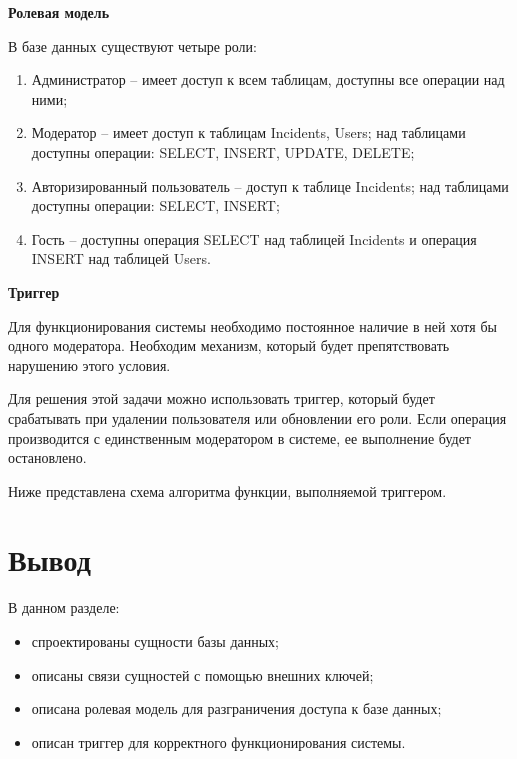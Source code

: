 \noindent\textbf{Ролевая модель}

В базе данных существуют четыре роли:
\begin{enumerate}
\item Администратор -- имеет доступ к всем таблицам, доступны все операции над ними;
\item Модератор -- имеет доступ к таблицам Incidents, Users; над таблицами доступны операции: SELECT, INSERT, UPDATE, DELETE;
\item Авторизированный пользователь -- доступ к таблице Incidents; над таблицами доступны операции: SELECT, INSERT; 
\item Гость -- доступны операция SELECT над таблицей Incidents и операция INSERT над таблицей Users.
\end{enumerate}

\noindent\textbf{Триггер}

Для функционирования системы необходимо постоянное наличие в ней хотя бы одного модератора. Необходим механизм, который будет препятствовать нарушению этого условия.

Для решения этой задачи можно использовать триггер, который будет срабатывать при удалении пользователя или обновлении его роли. Если операция производится с единственным модератором в системе, ее выполнение будет остановлено. 

Ниже представлена схема алгоритма функции, выполняемой триггером.


\newpage
\section*{Вывод}
В данном разделе:
\begin{itemize}
\item спроектированы сущности базы данных;
\item описаны связи сущностей с помощью внешних ключей;
\item описана ролевая модель для разграничения доступа к базе данных;
\item описан триггер для корректного функционирования системы.
\end{itemize}